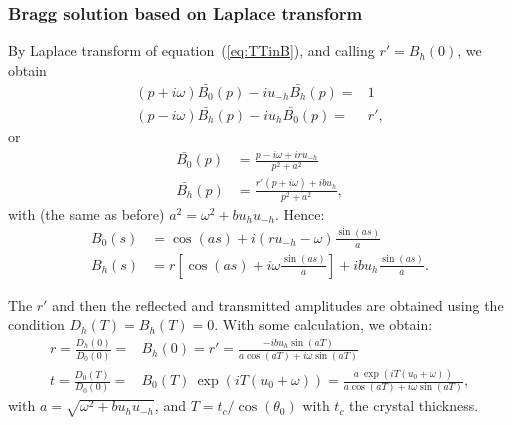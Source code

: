 \documentclass[preprint]{iucr}              %
\begin{document}
\subsubsection{Bragg solution based on Laplace transform}By Laplace transform of equation~(\ref{eq:TTinB}), and calling $r'=B_h(0)$, we obtain
\begin{subequations}
\label{eq:TTbraggLaplace}
\begin{align}
(p + i \omega) \bar{B_0}(p) - i u_{-h} \bar{B_h}(p)= & 1 \\
(p - i \omega) \bar{B_h}(p) - i u_{h} \bar{B_0}(p)= & r',
\end{align}
\end{subequations}
or 
\begin{subequations}
\begin{align}
\bar{B_0}(p) &= \frac{p - i \omega + i r u_{-h}}{p^2 + a^2} \\
\bar{B_h}(p) &= \frac{r' (p + i \omega) + i b u_h}{p^2 + a^2},
\end{align}
\end{subequations}
with (the same as before) $a^2=\omega^2+b u_h u_{-h}$. Hence:
\begin{subequations}
\begin{align}
B_0(s) &= \cos(a s) + i (r u_{-h} - \omega) \frac{\sin(a s)}{a}\\
B_h(s) &= r [\cos(a s) + i \omega \frac{\sin(a s)}{a}] + i b u_h \frac{\sin(a s)}{a}.
\end{align}
\end{subequations}

The $r'$ and then the reflected and transmitted amplitudes are obtained using the condition $D_h(T)=B_h(T)=0$. With some calculation, we obtain: 
\begin{subequations}
\begin{align}
r=\frac{D_h(0)}{D_0(0)} =& B_h(0) = r' = \frac{-i b u_h \sin(a T)}{a \cos(a T) + i\omega \sin(a T)}\\
t =\frac{D_0(T)}{D_0(0)}= & B_0(T) ~ \exp(i T (u_0+\omega)) = \frac{a~\exp(i T (u_0+\omega))}{a \cos(a T) + i\omega \sin(a T)} ,
\end{align}
\end{subequations}
with $a=\sqrt{\omega^2 + b u_h u_{-h}}$, and  
$T=t_c/\cos(\theta_0)$ with $t_c$ the crystal thickness.


\end{document}
